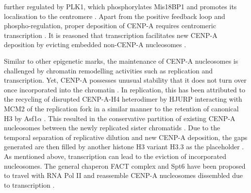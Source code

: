 further regulated by PLK1, which phosphorylates Mis18BP1 and promotes its localisation to the centromere \citep{McKinley2014Polo-likeCentromeres}. Apart from the positive feedback loop and phospho-regulation, proper deposition of CENP-A requires centromeric transcription \citep{Bergmann2012EpigeneticFunction, Catania2015SequenceChromatin, Cardinale2009HierarchicalModifier, Choi2011IdentificationCentromeres, Nakano2008InactivationModifiers, Zhu2018HistoneChromosomes}. It is reasoned that transcription facilitates new CENP-A deposition by evicting embedded non-CENP-A nucleosomes \citep{Chen2015EstablishmentTranscription, Choi2011IdentificationCentromeres, Bobkov2018, Bergmann2012EpigeneticFunction, Bobkov2020, Choi2017TheH3, Prasad2011NewCentromeres}. 

Similar to other epigenetic marks, the maintenance of CENP-A nucleosomes is challenged by chromatin remodelling activities such as replication and transcription. Yet, CENP-A possesses unusual stability that it does not turn over once incorporated into the chromatin \citep{Falk2015, Jansen2007, Bodor2013, Smoak2016Long-TermIdentity}. In replication, this has been attributed to the recycling of disrupted CENP-A-H4 heterodimer by HJURP interacting with MCM2 of the replication fork \citep{Zasadzinska2018, Zasadzinska2013DimerizationDeposition, Huang2015AForks} in a similar manner to the retention of canonical H3 by Asf1$\alpha$ \citep{Richet2015StructuralFork, Clement2015MCM2Fork}. This resulted in the conservative partition of existing CENP-A nucleosomes between the newly replicated sister chromatids \citep{Falk2015, Jansen2007, Bodor2013}. Due to the temporal separation of replicative dilution and new CENP-A deposition, the gaps generated are then filled by another histone H3 variant H3.3 as the placeholder \citep{Dunleavy2011H3.3Phase.}. As mentioned above, transcription can lead to the eviction of incorporated nucleosomes. The general chaperon FACT complex and Spt6 have been proposed to travel with RNA Pol II and reassemble CENP-A nucleosomes dissembled due to transcription \citep{Bobkov2020, Jeronimo2019HistoneModifications, Kato2013Spt6H3, Boltengagen2016AMelanogaster}.

